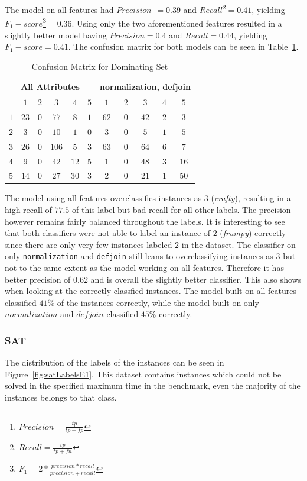 \par The model on all features had $Precision$\footnote{$Precision=\frac{tp}{tp+fp}$}$=0.39$ and $Recall$\footnote{$Recall=\frac{tp}{tp+fn}$}$=0.41$, yielding $F_1-score$\footnote{$F_1=2*\frac{precision*recall}{precision+recall}$}$=0.36$.
Using only the two aforementioned features resulted in a slightly better model having $Precision=0.4$ and $Recall=0.44$, yielding $F_1-score=0.41$. The confusion matrix for both models can be seen in Table~\ref{tbl:dsCME1}. 
\begin{table}[h]
\center
	\begin{tabular}{|c|ccccc|ccccc|}
		\hline
		\multicolumn{6}{|c|}{All Attributes} &\multicolumn{5}{|c|}{normalization, defjoin}\\
		\hline &$1$&$2$&$3$&$4$&$5$&$1$&$2$&$3$&$4$&$5$\\
		 \hline$1$&$23$&$0$&$77$ &$8$ &$1$&$62$&$0$&$42$&$2$&$3$\\
		 $2$&$3$ &$0$&$10$ &$1$ &$0$&$3$ &$0$&$5$ &$1$&$5$\\
		 $3$&$26$&$0$&$106$&$5$ &$3$&$63$&$0$&$64$&$6$&$7$\\
		 $4$&$9$ &$0$&$42$ &$12$&$5$&$1$ &$0$&$48$&$3$&$16$\\
		 $5$&$14$&$0$&$27$ &$30$&$3$&$2$ &$0$&$21$&$1$&$50$\\
		 \hline
	\end{tabular}
	\caption{Confusion Matrix for Dominating Set}
	\label{tbl:dsCME1}
\end{table}
\par The model using all features overclassifies instances as $3$ (\emph{crafty}), resulting in a high recall of $77.5$ of this label but bad recall for all other labels. The precision however remains fairly balanced throughout the labels. It is interesting to see that both classifiers were not able to label an instance of $2$ (\emph{frumpy}) correctly since there are only very few instances labeled $2$ in the dataset. The classifier on only \lstinline$normalization$ and \lstinline$defjoin$ still leans to overclassifying instances as $3$ but not to the same extent as the model working on all features.
Therefore it has better precision of $0.62$ and is overall the slightly better classifier. This also shows when looking at the correctly classfied instances. The model built on all features classified $41\%$ of the instances correctly, while the model built on only $normalization$ and $defjoin$ classified $45\%$ correctly.

\subsubsection{SAT}
The distribution of the labels of the instances can be seen in Figure~\ref{fig:satLabelsE1}. This dataset contains instances which could not be solved in the specified maximum time in the benchmark, even the majority of the instances belongs to that class. 

